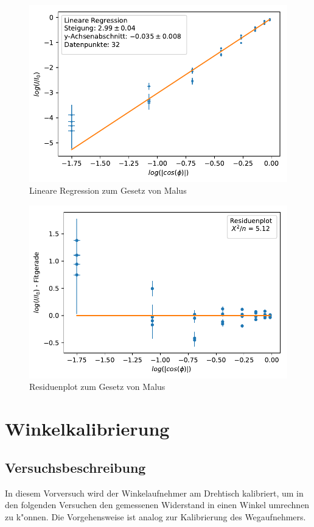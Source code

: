 \documentclass[12pt,a4paper]{article}
\begin{document}
\begin{figure}
	\centering
	\includegraphics[scale=1]{Bilder/Polarisation_LinReg.pdf}
	\caption{Lineare Regression zum Gesetz von Malus}
	\label{Polarisation_LinReg}
\end{figure}
\begin{figure}
	\centering
	\includegraphics[scale=1]{Bilder/Polarisation_Residuen.pdf}
	\caption{Residuenplot zum Gesetz von Malus}
	\label{Polarisation_Residuenplot}
\end{figure}


\newpage
\vphantom{v}
\newpage
\section{Winkelkalibrierung}
\subsection{Versuchsbeschreibung}
In diesem Vorversuch wird der Winkelaufnehmer am Drehtisch kalibriert, um in den folgenden Versuchen den gemessenen Widerstand in einen Winkel umrechnen zu k"onnen. Die Vorgehensweise ist analog zur Kalibrierung des Wegaufnehmers.
\end{document}
